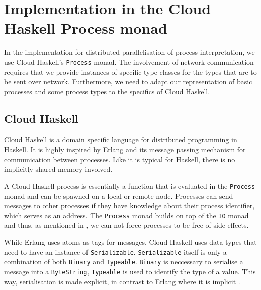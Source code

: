 \section{Implementation in the Cloud Haskell Process monad}
\label{chp:distributed}
In the implementation for distributed parallelisation of process interpretation, we use \textsf{Cloud Haskell}'s \texttt{Process} monad. The involvement of network communication requires that we provide instances of specific type classes for the types that are to be sent over network. Furthermore, we need to adapt our representation of basic processes and some process types to the specifics of \textsf{Cloud Haskell}. 

\subsection{Cloud Haskell}
\label{chp:cloud_haskell}
\textsf{Cloud Haskell} \cite{Epstein:2011:THC:2034675.2034690} is a domain specific language for distributed programming in Haskell. It is highly inspired by Erlang and its message passing mechanism for communication between processes. Like it is typical for \textsf{Haskell}, there is no implicitly shared memory involved.

A \textsf{Cloud Haskell} process is essentially a function that is evaluated in the \texttt{Process} monad and can be spawned on a local or remote node. Processes can send messages to other processes if they have knowledge about their process identifier, which serves as an address. The \texttt{Process} monad builds on top of the \texttt{IO} monad and thus, as mentioned in , we can not force processes to be free of side-effects.

While Erlang uses atoms as tags for messages, \textsf{Cloud Haskell} uses data types that need to have an instance of \texttt{Serializable}. \texttt{Serializable} itself is only a combination of both \texttt{Binary} and \texttt{Typeable}. \texttt{Binary} is neccessary to serialise a message into a \texttt{ByteString}, \texttt{Typeable} is used to identify the type of a value. This way, serialisation is made explicit, in contrast to Erlang where it is implicit \cite{Epstein:2011:THC:2034675.2034690}.

